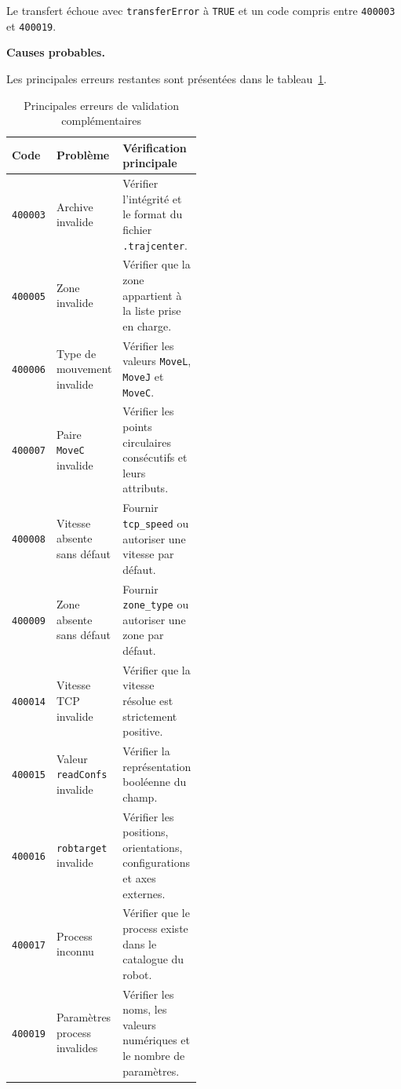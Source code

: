 \documentclass{rapportENSAM}
\begin{document}
Le transfert échoue avec \texttt{transferError} à \texttt{TRUE} et un code
compris entre \texttt{400003} et \texttt{400019}.

\textbf{Causes probables.}

Les principales erreurs restantes sont présentées dans le
tableau~\ref{tab:diagnostic-validation-code-summary}.

\begin{table}[ht]
\centering
\small
\begin{tabularx}{\linewidth}{
|p{0.17\linewidth}
|p{0.31\linewidth}
|X|
}
\hline
\textbf{Code} &
\textbf{Problème} &
\textbf{Vérification principale} \\
\hline
    \texttt{400003} &
    Archive invalide &
    Vérifier l'intégrité et le format du fichier
    \texttt{.trajcenter}. \\
    \hline

    \texttt{400005} &
    Zone invalide &
    Vérifier que la zone appartient à la liste prise en charge. \\
    \hline

    \texttt{400006} &
    Type de mouvement invalide &
    Vérifier les valeurs \texttt{MoveL}, \texttt{MoveJ} et
    \texttt{MoveC}. \\
    \hline

    \texttt{400007} &
    Paire \texttt{MoveC} invalide &
    Vérifier les points circulaires consécutifs et leurs attributs. \\
    \hline

    \texttt{400008} &
    Vitesse absente sans défaut &
    Fournir \texttt{tcp\_speed} ou autoriser une vitesse par défaut. \\
    \hline

    \texttt{400009} &
    Zone absente sans défaut &
    Fournir \texttt{zone\_type} ou autoriser une zone par défaut. \\
    \hline

    \texttt{400014} &
    Vitesse TCP invalide &
    Vérifier que la vitesse résolue est strictement positive. \\
    \hline

    \texttt{400015} &
    Valeur \texttt{readConfs} invalide &
    Vérifier la représentation booléenne du champ. \\
    \hline

    \texttt{400016} &
    \texttt{robtarget} invalide &
    Vérifier les positions, orientations, configurations et axes
    externes. \\
    \hline

    \texttt{400017} &
    Process inconnu &
    Vérifier que le process existe dans le catalogue du robot. \\
    \hline

    \texttt{400019} &
    Paramètres process invalides &
    Vérifier les noms, les valeurs numériques et le nombre de
    paramètres. \\
    \hline
\end{tabularx}
\caption{Principales erreurs de validation complémentaires}
\label{tab:diagnostic-validation-code-summary}
\end{table}
\end{document}
